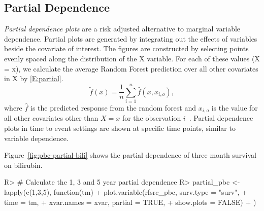 \documentclass[nojss]{jss}\usepackage[]{graphicx}\usepackage[]{color}
\begin{document}
\subsection{Partial Dependence}\label{S:partialdependence}

\emph{Partial dependence plots} are a risk adjusted alternative to marginal variable dependence. Partial plots are generated by integrating out the effects of variables beside the covariate of interest. The figures are constructed by selecting points evenly spaced along the distribution of the X variable. For each of these values (X = x), we calculate the average Random Forest prediction over all other covariates in X by \eqref{E:partial}.
\begin{equation}
\tilde{f}(x) = \frac{1}{n} \sum_{i = 1}^n \hat{f}(x, x_{i, o}), 
\label{E:partial}
\end{equation}
where $\hat{f}$ is the predicted response from the random forest and $x_{i, o}$ is the value for all other covariates other than $X = x$ for the observation $i$~\citep{Friedman:2000}. Partial dependence plots in time to event settings are shown at specific time points, similar to variable dependence.

Figure~\ref{fig:pbc-partial-bili} shows the partial dependence of three month survival on bilirubin. 

\begin{Schunk}
\begin{Sinput}
R> # Calculate the 1, 3 and 5 year partial dependence
R> partial_pbc <- lapply(c(1,3,5), function(tm){
+   plot.variable(rfsrc_pbc, surv.type = "surv", 
+                 time = tm, 
+                 xvar.names = xvar, partial = TRUE, 
+                 show.plots = FALSE)
+   })
\end{Sinput}
\end{Schunk}
\end{document}
